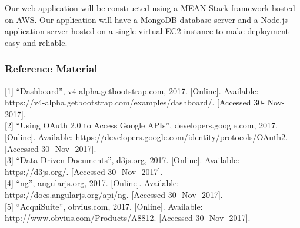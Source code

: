 \noindent Our web application will be constructed using a MEAN Stack framework hosted on AWS. Our application will have a MongoDB database server and a Node.js application server hosted on a single virtual EC2 instance to make deployment easy and reliable.

\subsubsection{Reference Material}
{[1]} ``Dashboard'', v4-alpha.getbootstrap.com, 2017. [Online]. Available: https://v4-alpha.getbootstrap.com/examples/dashboard/. [Accessed 30- Nov- 2017]. \\
{[2]} ``Using OAuth 2.0 to Access Google APIs'', developers.google.com, 2017. [Online]. Available: 		https://developers.google.com/identity/protocols/OAuth2. [Accessed 30- Nov- 2017]. \\
{[3]} ``Data-Driven Documents'', d3js.org, 2017. [Online]. Available: https://d3js.org/. [Accessed 30- Nov- 2017]. \\
{[4]} ``ng'', angularjs.org, 2017. [Online]. Available: https://docs.angularjs.org/api/ng. [Accessed 30- Nov- 2017]. \\
{[5]} ``AcquiSuite'', obvius.com, 2017. [Online]. Available: http://www.obvius.com/Products/A8812. [Accessed 30- Nov- 2017]. \\

